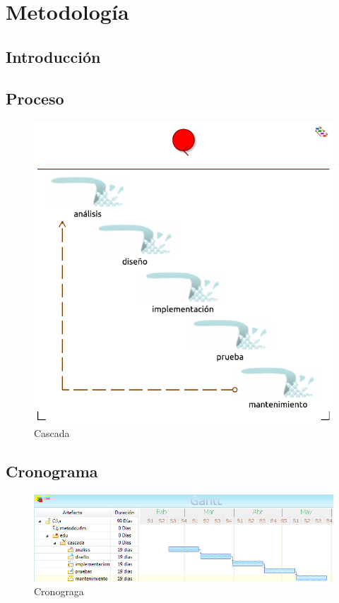\chapter{Metodología}

\section{Introducción}

\section{Proceso}

\begin{figure}[h!]
	\centering
	\includegraphics[width=0.5\linewidth]{Proyecto/Metodologia/imgs/cascada}
	\caption{Cascada \cite{MetSB,ID1,ID2}}
\end{figure}


\section{Cronograma}

\begin{figure}[h!]
	\centering
	\includegraphics[width=1\linewidth]{Proyecto/Metodologia/imgs/cronograma}
	\caption{Cronograga}
\end{figure}